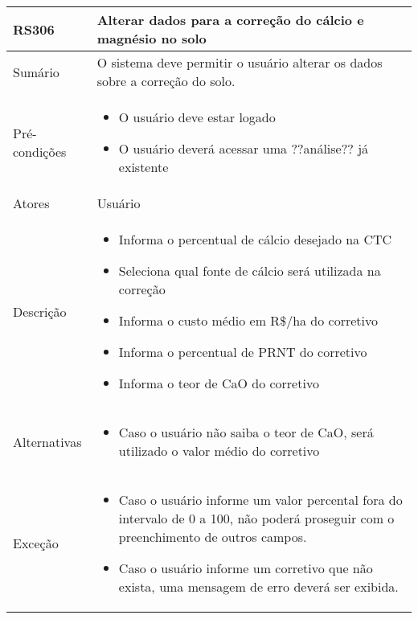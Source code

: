 \begin{quadro}[!htb]
    \begin{tabular}{|p{3cm}|p{11cm}|}
        \hline
        \textbf{RS306} & \textbf{Alterar dados para a correção do cálcio e magnésio no solo} \\
        \hline
        Sumário        & O sistema deve permitir o usuário alterar os dados sobre a correção do solo.                  \\
        \hline
        Pré-condições  & \begin{itemize}
            \item O usuário deve estar logado
            \item O usuário deverá acessar uma ??análise?? já existente 
        \end{itemize}                 \\
        \hline
        Atores         & Usuário                  \\
        \hline
        Descrição      &
        \begin{itemize}
            \item Informa o percentual de cálcio desejado na CTC
            \item Seleciona qual fonte de cálcio será utilizada na correção
            \item Informa o custo médio em R\$/ha do corretivo
            \item Informa o percentual de PRNT do corretivo
            \item Informa o teor de CaO do corretivo
        \end{itemize}                 \\
        \hline
        Alternativas   &
        \begin{itemize}
            \item Caso o usuário não saiba o teor de CaO, será utilizado o valor médio do corretivo
        \end{itemize}                 \\
        \hline
        Exceção        &
        \begin{itemize}
            \item Caso o usuário informe um valor percental fora do intervalo de 0 a 100, não poderá proseguir com o preenchimento de outros campos.
            \item Caso o usuário informe um corretivo que não exista, uma mensagem de erro deverá ser exibida.
        \end{itemize}                   \\
        \hline
    \end{tabular}
\end{quadro}

